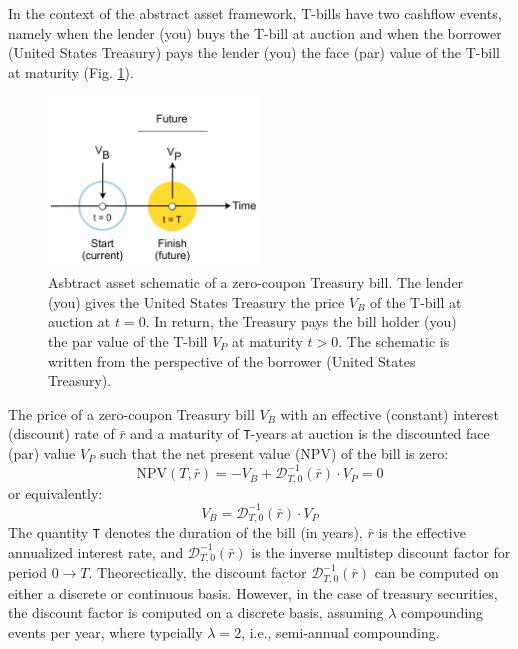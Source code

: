 \documentclass[11pt]{article}
\theoremstyle{definition}
\begin{document}
In the context of the abstract asset framework, T-bills have two cashflow events, namely when the lender (you) buys the T-bill at auction 
and when the borrower (United States Treasury) pays the lender (you) the face (par) value of the T-bill at maturity (Fig. \ref{fig:t-bill-schematic}).
\begin{figure}[h]
    \centering
    \includegraphics[width=0.5\textwidth]{./figs/Fig-Bill-Asset-Timeline-Schematic.pdf}
    \caption{Asbtract asset schematic of a zero-coupon Treasury bill. The lender (you) gives the United States Treasury 
    the price $V_{B}$ of the T-bill at auction at $ t = 0$. In return, the Treasury pays the bill holder (you) the par value of the T-bill $V_{P}$ at maturity $t>0$. 
	The schematic is written from the perspective of the borrower (United States Treasury).}\label{fig:t-bill-schematic}
\end{figure}
The price of a zero-coupon Treasury bill $V_{B}$ with an effective (constant) interest (discount) rate of $\bar{r}$ and a maturity of \texttt{T}-years at auction 
is the discounted face (par) value $V_{P}$ such that the net present value (NPV) of the bill is zero:
\begin{equation}    
\text{NPV}(T,\bar{r}) = -V_{B} + \mathcal{D}_{T,0}^{-1}(\bar{r})\cdot{V_{P}} = 0
\end{equation}
or equivalently:
\begin{equation}\label{eq:zero-coupon-treasury-bill-price}
    V_{B} = \mathcal{D}_{T,0}^{-1}(\bar{r})\cdot{V_{P}}
\end{equation}
The quantity \texttt{T} denotes the duration of the bill (in years), 
$\bar{r}$ is the effective annualized interest rate,  and $\mathcal{D}_{T,0}^{-1}(\bar{r})$ is the inverse multistep discount factor
for period $0\rightarrow{T}$. 
Theorectically, the discount factor $\mathcal{D}_{T,0}^{-1}(\bar{r})$ can be computed on either a discrete or continuous basis. 
However, in the case of treasury securities, the discount factor is computed on a discrete basis, assuming $\lambda$ compounding events per year, 
where typcially $\lambda = 2$, i.e., semi-annual compounding.
\end{document}
